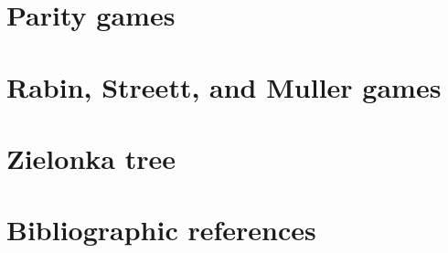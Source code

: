 
\section{Parity games}
\label{2-sec:parity}



\section{Rabin, Streett, and Muller games}
\label{2-sec:muller}



\section{Zielonka tree}
\label{2-sec:zielonka}



\section*{Bibliographic references}
\label{2-sec:references}




